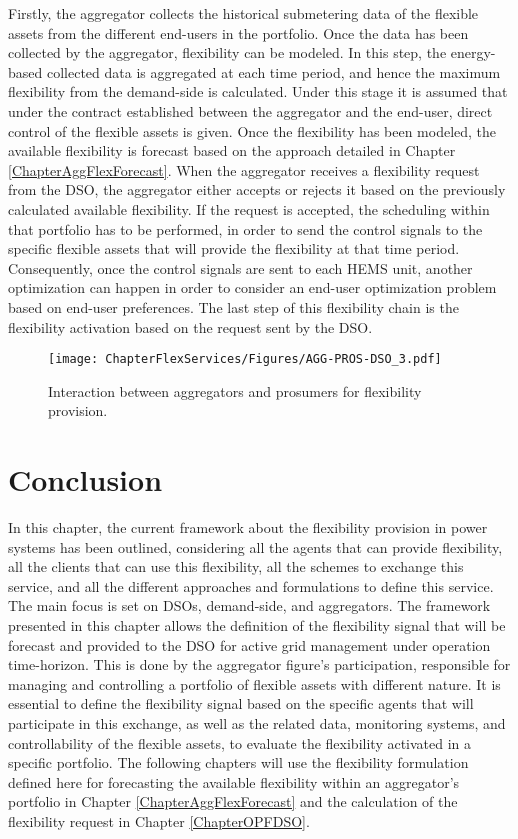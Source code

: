 Firstly, the aggregator collects the historical submetering data of the flexible assets from the different end-users in the portfolio. Once the data has been collected by the aggregator, flexibility can be modeled. In this step, the energy-based collected data is aggregated at each time period, and hence the maximum flexibility from the demand-side is calculated. Under this stage it is assumed that under the contract established between the aggregator and the end-user, direct control of the flexible assets is given. Once the flexibility has been modeled, the available flexibility is forecast based on the approach detailed in Chapter \ref{ChapterAggFlexForecast}. When the aggregator receives a flexibility request from the DSO, the aggregator either accepts or rejects it based on the previously calculated available flexibility. If the request is accepted, the scheduling within that portfolio has to be performed, in order to send the control signals to the specific flexible assets that will provide the flexibility at that time period. Consequently, once the control signals are sent to each HEMS unit, another optimization can happen in order to consider an end-user optimization problem based on end-user preferences. The last step of this flexibility chain is the flexibility activation based on the request sent by the DSO.

\begin{figure}[htbp]
	\centering
	\texttt{[image: ChapterFlexServices/Figures/AGG-PROS-DSO\_3.pdf]}
		\caption{Interaction between aggregators and prosumers for flexibility provision.}
	\label{fig:agg-pros-dso}  
\end{figure}

\newpage
\section{Conclusion}

In this chapter, the current framework about the flexibility provision in power systems has been outlined, considering all the agents that can provide flexibility, all the clients that can use this flexibility, all the schemes to exchange this service, and all the different approaches and formulations to define this service. The main focus is set on DSOs, demand-side, and aggregators. The framework presented in this chapter allows the definition of the flexibility signal that will be forecast and provided to the DSO for active grid management under operation time-horizon. This is done by the aggregator figure's participation, responsible for managing and controlling a portfolio of flexible assets with different nature. It is essential to define the flexibility signal based on the specific agents that will participate in this exchange, as well as the related data, monitoring systems, and controllability of the flexible assets, to evaluate the flexibility activated in a specific portfolio. The following chapters will use the flexibility formulation defined here for forecasting the available flexibility within an aggregator's portfolio in Chapter \ref{ChapterAggFlexForecast} and the calculation of the flexibility request in Chapter \ref{ChapterOPFDSO}. 



